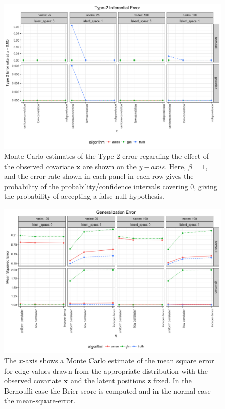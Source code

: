 \documentclass[11pt]{article}
\begin{document}
\begin{figure}
\includegraphics[width=\textwidth]{figures/inference_type_2_amen.png}
\caption{Monte Carlo estimates of the Type-2 error regarding the effect of the observed covariate $\mathbf{x}$ are shown on the $y-axis$. Here, $\beta = 1$, and the error rate shown in each panel in each row gives the probability of the probability/confidence intervals covering $0$, giving the probability of accepting a false null hypothesis. \label{fig:inference_type_2_amen}}
\end{figure}

\begin{figure}
\includegraphics[width=\textwidth]{figures/generalization_amen.png}
\caption{The $x$-axis shows a Monte Carlo estimate of the mean square error for edge values drawn from the appropriate distribution with the observed covariate $\mathbf{x}$ and the latent positions $\mathbf{z}$ fixed. In the Bernoulli case the Brier score is computed and in the normal case the mean-square-error. \label{fig:generalization_amen}}
\end{figure}
\end{document}

